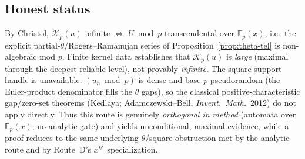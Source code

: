 \subsection{Honest status}
By Christol, $\mathcal K_p(u)$ infinite $\iff$ $U\bmod p$ transcendental over
$\mathbb F_p(x)$, i.e.\ the explicit partial-$\theta$/Rogers--Ramanujan series of
Proposition~\ref{prop:theta-tel} is non-algebraic mod $p$. Finite kernel data
establishes that $\mathcal K_p(u)$ is \emph{large} (maximal through the deepest
reliable level), not provably \emph{infinite}. The square-support handle is
unavailable: $(u_n\bmod p)$ is dense and base-$p$ pseudorandom (the Euler-product
denominator fills the $\theta$ gaps), so the classical positive-characteristic
gap/zero-set theorems (Kedlaya; Adamczewski--Bell, \emph{Invent.\ Math.}\ 2012)
do not apply directly. Thus this route is genuinely \emph{orthogonal in method}
(automata over $\mathbb F_p(x)$, no analytic gate) and yields unconditional,
maximal evidence, while a proof reduces to the same underlying
$\theta$/square obstruction met by the analytic route and by
Route~D's $x^{k^2}$ specialization.
